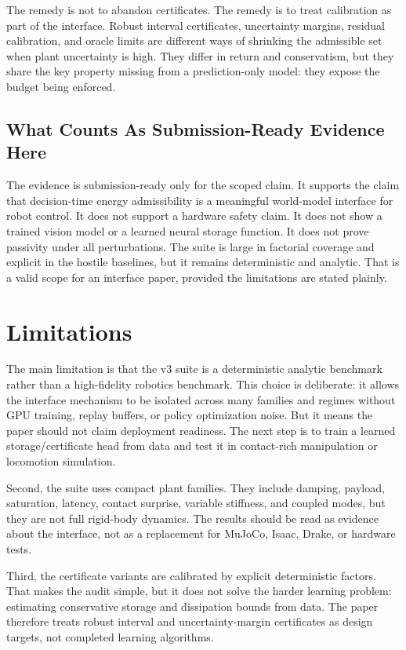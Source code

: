 \documentclass{article}
\begin{document}
The remedy is not to abandon certificates. The remedy is to treat calibration as part of the interface. Robust interval certificates, uncertainty margins, residual calibration, and oracle limits are different ways of shrinking the admissible set when plant uncertainty is high. They differ in return and conservatism, but they share the key property missing from a prediction-only model: they expose the budget being enforced.

\subsection{What Counts As Submission-Ready Evidence Here}

The evidence is submission-ready only for the scoped claim. It supports the claim that decision-time energy admissibility is a meaningful world-model interface for robot control. It does not support a hardware safety claim. It does not show a trained vision model or a learned neural storage function. It does not prove passivity under all perturbations. The suite is large in factorial coverage and explicit in the hostile baselines, but it remains deterministic and analytic. That is a valid scope for an interface paper, provided the limitations are stated plainly.

\section{Limitations}

The main limitation is that the v3 suite is a deterministic analytic benchmark rather than a high-fidelity robotics benchmark. This choice is deliberate: it allows the interface mechanism to be isolated across many families and regimes without GPU training, replay buffers, or policy optimization noise. But it means the paper should not claim deployment readiness. The next step is to train a learned storage/certificate head from data and test it in contact-rich manipulation or locomotion simulation.

Second, the suite uses compact plant families. They include damping, payload, saturation, latency, contact surprise, variable stiffness, and coupled modes, but they are not full rigid-body dynamics. The results should be read as evidence about the interface, not as a replacement for MuJoCo, Isaac, Drake, or hardware tests.

Third, the certificate variants are calibrated by explicit deterministic factors. That makes the audit simple, but it does not solve the harder learning problem: estimating conservative storage and dissipation bounds from data. The paper therefore treats robust interval and uncertainty-margin certificates as design targets, not completed learning algorithms.
\end{document}
